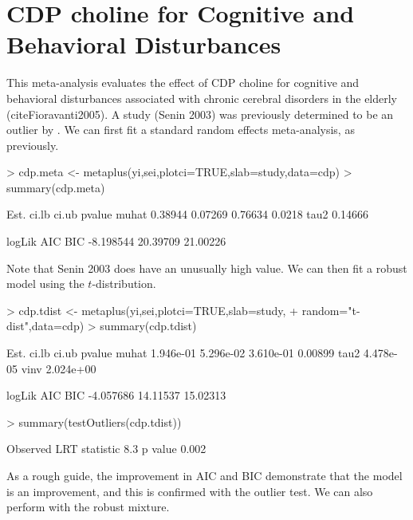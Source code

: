 \documentclass{article}
\begin{document}
\section{CDP choline for Cognitive and Behavioral Disturbances}

This meta-analysis evaluates the effect of CDP choline for cognitive and
behavioral disturbances associated with chronic cerebral disorders in the elderly (cite{Fioravanti2005}). A study (Senin 2003) was previously determined to be an outlier by \citet{Gumedze2011}. We can first fit a standard random effects meta-analysis, as previously.

\begin{Schunk}
\begin{Sinput}
> cdp.meta <- metaplus(yi,sei,plotci=TRUE,slab=study,data=cdp)
> summary(cdp.meta)
\end{Sinput}
\begin{Soutput}
         Est.   ci.lb   ci.ub pvalue
muhat 0.38944 0.07269 0.76634 0.0218
tau2  0.14666                       

     logLik      AIC      BIC
  -8.198544 20.39709 21.00226
\end{Soutput}
\end{Schunk}
Note that Senin 2003 does have an unusually high value. We can then fit a robust model using the $t$-distribution.

\begin{Schunk}
\begin{Sinput}
> cdp.tdist <- metaplus(yi,sei,plotci=TRUE,slab=study,
+         random="t-dist",data=cdp)
> summary(cdp.tdist)
\end{Sinput}
\begin{Soutput}
           Est.     ci.lb     ci.ub  pvalue
muhat 1.946e-01 5.296e-02 3.610e-01 0.00899
tau2  4.478e-05                            
vinv  2.024e+00                            

     logLik      AIC      BIC
  -4.057686 14.11537 15.02313
\end{Soutput}
\begin{Sinput}
> summary(testOutliers(cdp.tdist))
\end{Sinput}
\begin{Soutput}
Observed LRT statistic 8.3 p value 0.002
\end{Soutput}
\end{Schunk}
As a rough guide, the improvement in AIC and BIC demonstrate that the model is an improvement, and this is confirmed with the outlier test. We can also perform with the robust mixture.
\end{document}
